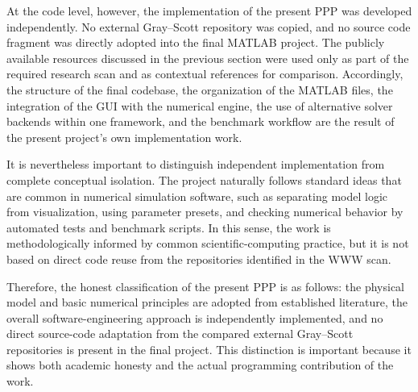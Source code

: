 At the code level, however, the implementation of the present PPP was developed independently. No external Gray--Scott repository was copied, and no source code fragment was directly adopted into the final MATLAB project. The publicly available resources discussed in the previous section were used only as part of the required research scan and as contextual references for comparison. Accordingly, the structure of the final codebase, the organization of the MATLAB files, the integration of the GUI with the numerical engine, the use of alternative solver backends within one framework, and the benchmark workflow are the result of the present project's own implementation work.

It is nevertheless important to distinguish independent implementation from complete conceptual isolation. The project naturally follows standard ideas that are common in numerical simulation software, such as separating model logic from visualization, using parameter presets, and checking numerical behavior by automated tests and benchmark scripts. In this sense, the work is methodologically informed by common scientific-computing practice, but it is not based on direct code reuse from the repositories identified in the WWW scan.

Therefore, the honest classification of the present PPP is as follows: the physical model and basic numerical principles are adopted from established literature, the overall software-engineering approach is independently implemented, and no direct source-code adaptation from the compared external Gray--Scott repositories is present in the final project. This distinction is important because it shows both academic honesty and the actual programming contribution of the work.